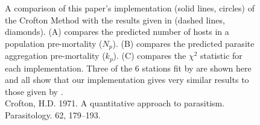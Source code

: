 \documentclass[12pt, a4paper]{article}
\begin{document}
\begin{figure}

    \captionsetup{justification=raggedright, singlelinecheck=false}
    \caption{\doublespacing A comparison of this paper's implementation (solid lines, circles) of the Crofton Method with the results given in \cite{Crofton1971a} (dashed lines, diamonds).  (A) compares the predicted number of hosts in a population pre-mortality ($N_p$). (B) compares the predicted parasite aggregation pre-mortality ($k_p$).  (C) compares the $\chi^2$ statistic for each implementation.  Three of the 6 stations fit by \citeauthor{Crofton1971a} are shown here and all show that our implementation gives very similar results to those given by \citeauthor{Crofton1971a}.\\\hspace{\textwidth}Crofton, H.D. 1971. A quantitative approach to parasitism. Parasitology. 62, 179–193.}
    \label{fig:crof_test}

\end{figure}
\end{document}
